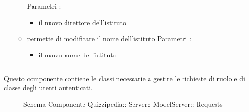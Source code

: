 \begin{itemize}
\begin{itemize}
\newline
Parametri :
\begin{itemize}
\item {}
\newline
il nuovo direttore dell'istituto
\end{itemize}
\item {}
\newline
permette di modificare il nome dell'istituto
\newline
Parametri :
\begin{itemize}
\item {}
\newline
il nuovo nome dell'istituto
\end{itemize}
\end{itemize}
\end{itemize}
\subsection{}
Questo componente contiene le classi necessarie a gestire le richieste di ruolo e di classe degli utenti autenticati.
\begin{figure}[H]
\centering
\noindent{}
\caption[Schema Componente Requests]{Schema Componente Quizzipedia:: Server:: ModelServer:: Requests}
\end{figure}
